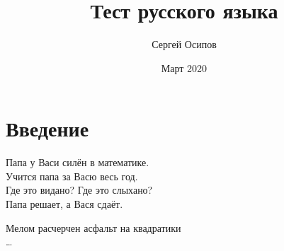 \documentclass{article}
\title{Тест русского языка}
\author{Сергей Осипов}
\date{Март 2020}
\begin{document}
\maketitle

\section{Введение}
Папа у Васи силён в математике.\\
Учится папа за Васю весь год.\\
Где это видано? Где это слыхано?\\
Папа решает, а Вася сдаёт.
\bigskip

Мелом расчерчен асфальт на квадратики\\
\dots
\end{document}
